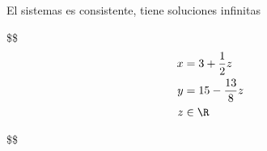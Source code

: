\documentclass[
]{article}
\begin{document}
El sistemas es consistente, tiene soluciones infinitas

\$\$ \begin{align*}
   x &= 3 + \frac{1}{2}z\\
   y &= 15 - \frac{13}{8}z\\
   z& \in \R
\end{align*}

\$\$

\hypertarget{se-va-a-construir-un-gran-edificio-de-departamentos.-la-distribuciuxf3n-de-los-departamentos-en-cualquier-piso-dado-se-elige-entre-tres-diseuxf1os-de-piso-buxe1sicos.-cada-piso-del-diseuxf1o-a-incluye-3-unidades-de-tres-dormitorios-7-con-dos-dormitorios-y-8-con-un-dormitorio.-cada-piso-del-diseuxf1o-b-incluye-4-unidades-con-tres-dormitorios-4-con-dos-dormitorios-y-8-con-un-dormitorio.-cada-piso-del-diseuxf1o-c-incluye-5-unidades-con-tres-dormitorios-3-con-dos-dormitorios-y-9-con-un-dormitorio.-es-posible-diseuxf1ar-el-edificio-de-tal-forma-que-tenga-exactamente-66-unidades-con-tres-dormitorios-74-unidades-con-dos-dormitorios-y-136-unidades-con-un-dormitorio-si-la-respuesta-es-afirmativa-proponga-una-distribuciuxf3n-de-pisos-de-cada-diseuxf1o.}{%
}
\end{document}
